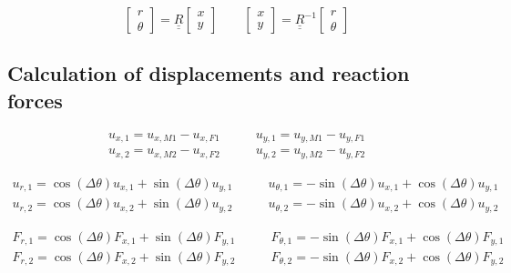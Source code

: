 \documentclass[a4paper]{jpconf}
\begin{document}
\begin{equation}
\begin{bmatrix}
r \\
\theta
\end{bmatrix}=\underline{\underline{R}}\begin{bmatrix}
x \\
y
\end{bmatrix}\qquad\begin{bmatrix}
x \\
y
\end{bmatrix}=\underline{\underline{R}}^{-1}\begin{bmatrix}
r \\
\theta
\end{bmatrix}
\end{equation}

\subsection{Calculation of displacements and reaction forces}

\begin{equation}
\begin{split}
u_{x,1}=u_{x,M1}-u_{x,F1}&\qquad u_{y,1}=u_{y,M1}-u_{y,F1}\\
u_{x,2}=u_{x,M2}-u_{x,F2}&\qquad u_{y,2}=u_{y,M2}-u_{y,F2}
\end{split}
\end{equation}

\begin{equation}
\begin{split}
u_{r,1}=\cos\left(\Delta\theta\right) u_{x,1}+\sin\left(\Delta\theta\right) u_{y,1}&\qquad u_{\theta,1}=-\sin\left(\Delta\theta\right) u_{x,1}+\cos\left(\Delta\theta\right) u_{y,1}\\
u_{r,2}=\cos\left(\Delta\theta\right) u_{x,2}+\sin\left(\Delta\theta\right) u_{y,2}&\qquad u_{\theta,2}=-\sin\left(\Delta\theta\right) u_{x,2}+\cos\left(\Delta\theta\right) u_{y,2}
\end{split}
\end{equation}

\begin{equation}
\begin{split}
F_{r,1}=\cos\left(\Delta\theta\right) F_{x,1}+\sin\left(\Delta\theta\right) F_{y,1}&\qquad F_{\theta,1}=-\sin\left(\Delta\theta\right) F_{x,1}+\cos\left(\Delta\theta\right) F_{y,1}\\
F_{r,2}=\cos\left(\Delta\theta\right) F_{x,2}+\sin\left(\Delta\theta\right) F_{y,2}&\qquad F_{\theta,2}=-\sin\left(\Delta\theta\right) F_{x,2}+\cos\left(\Delta\theta\right) F_{y,2}\\
\end{split}
\end{equation}
\end{document}
